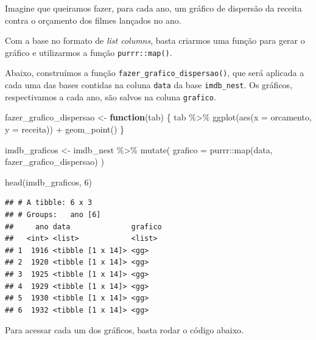 \documentclass[
]{book}
\newenvironment{Shaded}{\begin{snugshade}}{\end{snugshade}}
\newcommand{\AttributeTok}[1]{\textcolor[rgb]{0.77,0.63,0.00}{#1}}
\newcommand{\CommentTok}[1]{\textcolor[rgb]{0.56,0.35,0.01}{\textit{#1}}}
\newcommand{\ControlFlowTok}[1]{\textcolor[rgb]{0.13,0.29,0.53}{\textbf{#1}}}
\newcommand{\DecValTok}[1]{\textcolor[rgb]{0.00,0.00,0.81}{#1}}
\newcommand{\FunctionTok}[1]{\textcolor[rgb]{0.00,0.00,0.00}{#1}}
\newcommand{\NormalTok}[1]{#1}
\newcommand{\OtherTok}[1]{\textcolor[rgb]{0.56,0.35,0.01}{#1}}
\newcommand{\SpecialCharTok}[1]{\textcolor[rgb]{0.00,0.00,0.00}{#1}}
\begin{document}
Imagine que queiramos fazer, para cada ano, um gráfico de dispersão da receita contra o orçamento dos filmes lançados no ano.

Com a base no formato de \emph{list columns}, basta criarmos uma função para gerar o gráfico e utilizarmos a função \texttt{purrr::map()}.

Abaixo, construímos a função \texttt{fazer\_grafico\_dispersao()}, que será aplicada a cada uma das bases contidas na coluna \texttt{data} da base \texttt{imdb\_nest}. Os gráficos, respectivamos a cada ano, são salvos na coluna \texttt{grafico}.

\begin{Shaded}
\begin{Highlighting}[]
\NormalTok{fazer\_grafico\_dispersao }\OtherTok{\textless{}{-}} \ControlFlowTok{function}\NormalTok{(tab) \{}
\NormalTok{  tab }\SpecialCharTok{\%\textgreater{}\%}
    \FunctionTok{ggplot}\NormalTok{(}\FunctionTok{aes}\NormalTok{(}\AttributeTok{x =}\NormalTok{ orcamento, }\AttributeTok{y =}\NormalTok{ receita)) }\SpecialCharTok{+}
    \FunctionTok{geom\_point}\NormalTok{()}
\NormalTok{\}}

\NormalTok{imdb\_graficos }\OtherTok{\textless{}{-}}\NormalTok{ imdb\_nest }\SpecialCharTok{\%\textgreater{}\%} 
  \FunctionTok{mutate}\NormalTok{(}
    \AttributeTok{grafico =}\NormalTok{ purrr}\SpecialCharTok{::}\FunctionTok{map}\NormalTok{(data, fazer\_grafico\_dispersao)}
\NormalTok{  )}

\FunctionTok{head}\NormalTok{(imdb\_graficos, }\DecValTok{6}\NormalTok{)}
\end{Highlighting}
\end{Shaded}

\begin{verbatim}
## # A tibble: 6 x 3
## # Groups:   ano [6]
##     ano data              grafico
##   <int> <list>            <list> 
## 1  1916 <tibble [1 x 14]> <gg>   
## 2  1920 <tibble [1 x 14]> <gg>   
## 3  1925 <tibble [1 x 14]> <gg>   
## 4  1929 <tibble [1 x 14]> <gg>   
## 5  1930 <tibble [1 x 14]> <gg>   
## 6  1932 <tibble [1 x 14]> <gg>
\end{verbatim}

Para acessar cada um dos gráficos, basta rodar o código abaixo.

\begin{Shaded}
\end{Shaded}
\end{document}
